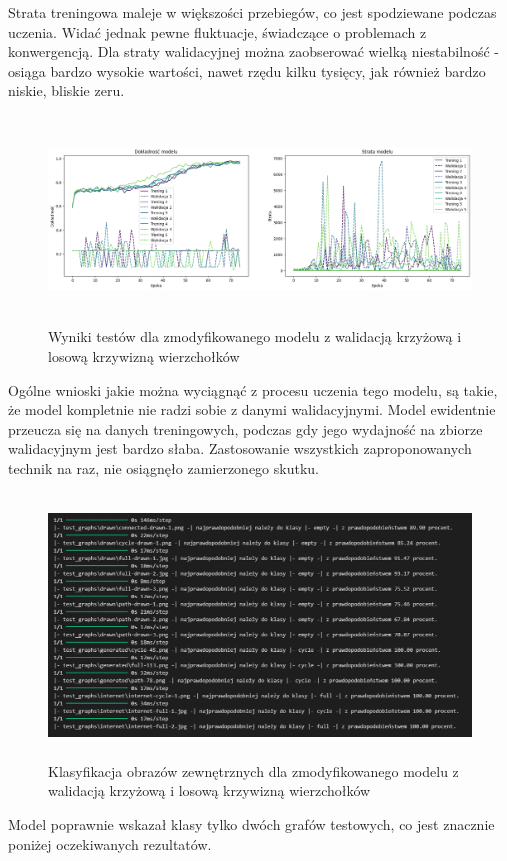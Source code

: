 Strata treningowa maleje w większości przebiegów, co jest spodziewane podczas uczenia.
Widać jednak pewne fluktuacje, świadczące o problemach z konwergencją.
Dla straty walidacyjnej można zaobserować wielką niestabilność - osiąga bardzo wysokie wartości,
nawet rzędu kilku tysięcy, jak również bardzo niskie, bliskie zeru.

\begin{figure}[ht]
	\centering
	\includegraphics[height=5.5cm]{resources/tests/images/v4/crossvalid_img.png}
	\caption{Wyniki testów dla zmodyfikowanego modelu z walidacją krzyżową i losową krzywizną wierzchołków}
	\label{Fig:tests-cv-1}
\end{figure}
\FloatBarrier

Ogólne wnioski jakie można wyciągnąć z procesu uczenia tego modelu,
są takie, że model kompletnie nie radzi sobie z danymi walidacyjnymi.
Model ewidentnie przeucza się na danych treningowych,
podczas gdy jego wydajność na zbiorze walidacyjnym jest bardzo słaba.
Zastosowanie wszystkich zaproponowanych technik na raz,
nie osiągnęło zamierzonego skutku. 

\begin{figure}[ht]
	\centering
	\includegraphics[height=7cm]{resources/tests/images/v4/crossvalid_txt.png}
	\caption{Klasyfikacja obrazów zewnętrznych dla zmodyfikowanego modelu z walidacją krzyżową i losową krzywizną wierzchołków}
	\label{Fig:tests-cv-2}
\end{figure}
\FloatBarrier

Model poprawnie wskazał klasy tylko dwóch grafów testowych, co jest znacznie poniżej oczekiwanych rezultatów.